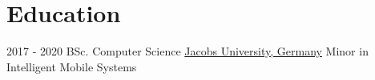 \documentclass[letterpaper]{twentysecondcv} %
\begin{document}
\makeprofile %

\section{Education}

\begin{twenty} %
	\twentyitem
    	{2017 - 2020}
        {}
        {BSc. Computer Science}
        {\href{https://www.jacobs-university.de}{Jacobs University, Germany}}
        {Minor in Intelligent Mobile Systems
        }
      
\end{twenty}

        

\end{document}
